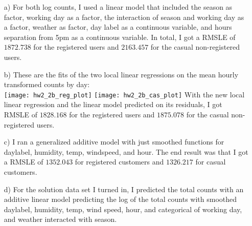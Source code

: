 \documentclass[11pt]{article}
\theoremstyle{definition}
\begin{document}
\begin{itemize}
        \begin{itemize}
            \item[a)]
                For both log counts, I used a linear model that included the season as factor, working day as a factor, the interaction of season and working day as a factor, weather as factor, day label as a continuous variable, and hours separation from 5pm as a continuous variable. In total, I got a RMSLE of $1872.738$ for the registered users and $2163.457$ for the casual non-registered users.
            \item[b)]
                These are the fits of the two local linear regressions on the mean hourly transformed counts by day: \\
                \texttt{[image: hw2\_2b\_reg\_plot]}
                \texttt{[image: hw2\_2b\_cas\_plot]}
                With the new local linear regression and the linear model predicted on its residuals, I got RMSLE of $1828.168$ for the registered users and $1875.078$ for the casual non-registered users.
            \item[c)]
                I ran a generalized additive model with just smoothed functions for daylabel, humidity, temp, windspeed, and hour. The end result was that I got a RMSLE of $1352.043$ for registered customers and $1326.217$ for casual customers.
            \item[d)]
                For the solution data set I turned in, I predicted the total counts with an additive linear model predicting the log of the total counts with smoothed daylabel, humidity, temp, wind speed, hour, and categorical of working day, and weather interacted with season.


\end{itemize}
\end{itemize}
\end{document}
